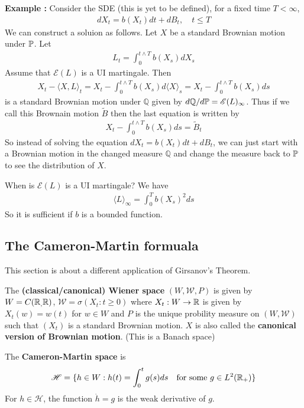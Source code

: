 \documentclass[12pt,a4paper]{article}
\begin{document}
\textbf{Example :} Consider the SDE (this is yet to be defined), for a fixed time $T< \infty$,
\begin{align*}
dX_t =b(X_t) dt + dB_t, \quad t\leq T
\end{align*}
We can construct a soluion as follows. Let $X$ be a standard Brownian motion under $\mathbb{P}$. Let
\begin{align*}
L_t = \int_0^{t\wedge T} b(X_s) dX_s
\end{align*}
Assume that $\mathscr{E}(L)$ is a UI martingale. Then
\begin{align*}
X_t - \langle X, L\rangle_t = X_t - \int_0^{t\wedge T} b(X_s) d\langle X \rangle_s = X_t - \int_0^{t\wedge T} b(X_s) ds
\end{align*}
is a standard Brownian motion under $\mathbb{Q}$ given by $d\mathbb{Q} / d\mathbb{P} = \mathscr{E}(L)_{\infty}$. Thus if we call this Brownain motion $\tilde{B}$ then the last equation is written by
\begin{align*}
X_t - \int_0^{t\wedge T}b(X_s) ds = \tilde{B}_t
\end{align*}
So instead of solving the equation $dX_t = b(X_t) dt + dB_t$, we can just start with a Brownian motion in the changed measure $\mathbb{Q}$ and change the measure back to $\mathbb{P}$ to see the distribution of $X$.

\quad When is $\mathscr{E}(L)$ is a UI martingale? We have
\begin{align*}
\langle L \rangle_{\infty} = \int_0^T b(X_s)^2 ds
\end{align*}
So it is sufficient if $b$ is a bounded function.

\subsection{The Cameron-Martin formuala}

This section is about a different application of Girsanov's Theorem.
\s

 The \textbf{(classical/canonical) Wiener space} $(W,\mathscr{W}, P)$ is given by $W = C(\mathbb{R}_, \mathbb{R})$, $\mathscr{W} = \sigma(X_t : t\geq 0)$ where $X_t : W\rightarrow \mathbb{R}$ is given by $X_t(w) = w(t)$ for $w\in W$ and $P$ is the unique probility measure on $(W, \mathscr{W})$ such that $(X_t)$ is a standard Brownian motion. $X$ is also called the \textbf{canonical version of Brownian motion}. (This is a Banach space)
\s

 The \textbf{Cameron-Martin space} is
\begin{align*}
\mathscr{H} = \{h \in W : h(t) = \int_0^t g(s) ds \quad \text{for some }g\in L^2(\mathbb{R}_+) \}
\end{align*}
For $h\in \mathscr{H}$, the function $\dot{h} =g$ is the weak derivative of $g$.
\s
\end{document}
